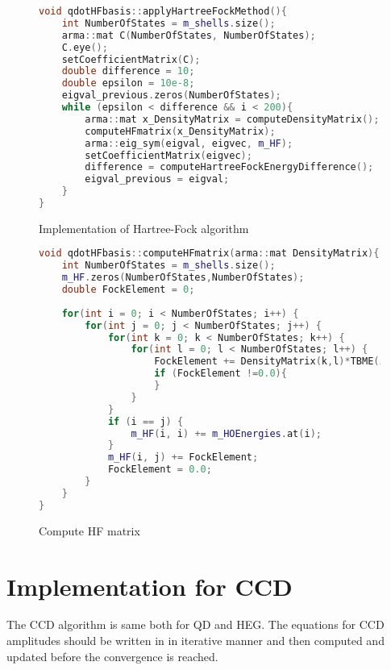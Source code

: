 \documentclass[twoside,english]{uiofysmaster}
\theoremstyle{definition}
\begin{document}
\begin{figure}
	\begin{lstlisting}[language=C++]
void qdotHFbasis::applyHartreeFockMethod(){
	int NumberOfStates = m_shells.size();
	arma::mat C(NumberOfStates, NumberOfStates);
	C.eye();
	setCoefficientMatrix(C);
	double difference = 10; 
	double epsilon = 10e-8;
	eigval_previous.zeros(NumberOfStates);
	while (epsilon < difference && i < 200){
		arma::mat x_DensityMatrix = computeDensityMatrix();
		computeHFmatrix(x_DensityMatrix);
		arma::eig_sym(eigval, eigvec, m_HF);
		setCoefficientMatrix(eigvec);
		difference = computeHartreeFockEnergyDifference();
		eigval_previous = eigval;
	}
}
\end{lstlisting}
\caption{Implementation of Hartree-Fock algorithm} \label{f:applyHF}
\end{figure}



\begin{figure}
\begin{lstlisting}[language=C++]
void qdotHFbasis::computeHFmatrix(arma::mat DensityMatrix){
	int NumberOfStates = m_shells.size();
	m_HF.zeros(NumberOfStates,NumberOfStates);
	double FockElement = 0;
	
	for(int i = 0; i < NumberOfStates; i++) {
		for(int j = 0; j < NumberOfStates; j++) {
			for(int k = 0; k < NumberOfStates; k++) {
				for(int l = 0; l < NumberOfStates; l++) {
					FockElement += DensityMatrix(k,l)*TBME(i,k,j,l);
					if (FockElement !=0.0){
					}
				}
			}
			if (i == j) {
				m_HF(i, i) += m_HOEnergies.at(i);
			}
			m_HF(i, j) += FockElement;
			FockElement = 0.0;
		}
	}
}
\end{lstlisting}
\caption{Compute HF matrix}
\end{figure}
\section{Implementation for CCD}\label{sec:CCDimpl}
The CCD algorithm is same both for QD and HEG. The equations for CCD amplitudes should be written in in iterative manner and then computed and updated before the convergence is reached.\\
\end{document}
